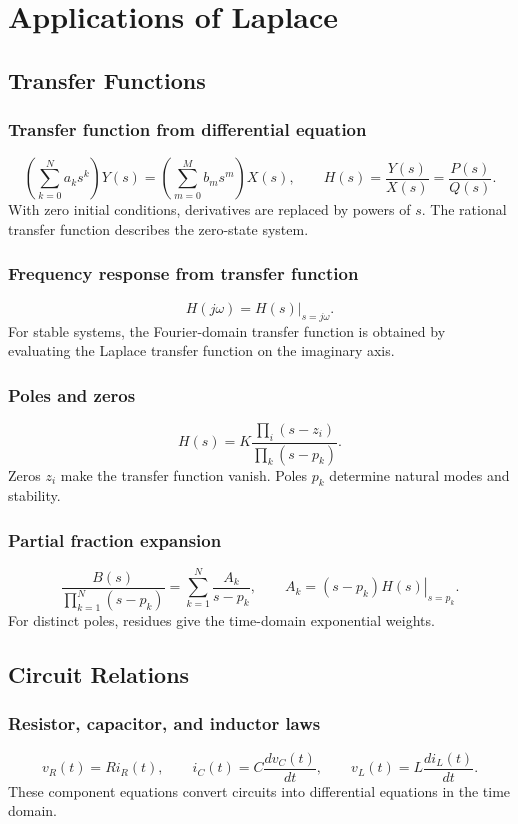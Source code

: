 \section{Applications of Laplace}

\subsection{Transfer Functions}

\subsubsection{Transfer function from differential equation}
\[
\left(\sum_{k=0}^{N}a_ks^k\right)Y(s)=
\left(\sum_{m=0}^{M}b_ms^m\right)X(s),
\qquad
H(s)=\frac{Y(s)}{X(s)}=\frac{P(s)}{Q(s)}.
\]
With zero initial conditions, derivatives are replaced by powers of \(s\). The rational transfer function describes the zero-state system.

\subsubsection{Frequency response from transfer function}
\[
H(j\omega)=H(s)\big|_{s=j\omega}.
\]
For stable systems, the Fourier-domain transfer function is obtained by evaluating the Laplace transfer function on the imaginary axis.

\subsubsection{Poles and zeros}
\[
H(s)=K\frac{\prod_i(s-z_i)}{\prod_k(s-p_k)}.
\]
Zeros \(z_i\) make the transfer function vanish. Poles \(p_k\) determine natural modes and stability.

\subsubsection{Partial fraction expansion}
\[
\frac{B(s)}{\prod_{k=1}^{N}(s-p_k)}
=\sum_{k=1}^{N}\frac{A_k}{s-p_k},
\qquad
A_k=\left.(s-p_k)H(s)\right|_{s=p_k}.
\]
For distinct poles, residues give the time-domain exponential weights.

\subsection{Circuit Relations}

\subsubsection{Resistor, capacitor, and inductor laws}
\[
v_R(t)=Ri_R(t),\qquad i_C(t)=C\frac{dv_C(t)}{dt},\qquad v_L(t)=L\frac{di_L(t)}{dt}.
\]
These component equations convert circuits into differential equations in the time domain.

